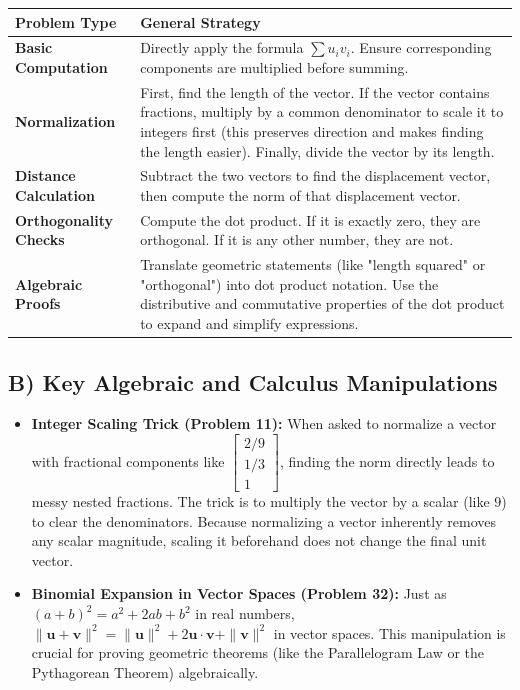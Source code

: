 \documentclass[11pt, letterpaper]{article}
\theoremstyle{definition}
\theoremstyle{remark}
\begin{document}
\renewcommand{\arraystretch}{1.5}
\begin{tabularx}{\textwidth}{>{\raggedright\arraybackslash}p{4cm} X}
\toprule
\textbf{Problem Type} & \textbf{General Strategy} \\
\midrule
\textbf{Basic Computation} & Directly apply the formula $\sum u_i v_i$. Ensure corresponding components are multiplied before summing. \\
\addlinespace[4pt]
\textbf{Normalization} & First, find the length of the vector. If the vector contains fractions, multiply by a common denominator to scale it to integers first (this preserves direction and makes finding the length easier). Finally, divide the vector by its length. \\
\addlinespace[4pt]
\textbf{Distance Calculation} & Subtract the two vectors to find the displacement vector, then compute the norm of that displacement vector. \\
\addlinespace[4pt]
\textbf{Orthogonality Checks} & Compute the dot product. If it is exactly zero, they are orthogonal. If it is any other number, they are not. \\
\addlinespace[4pt]
\textbf{Algebraic Proofs} & Translate geometric statements (like "length squared" or "orthogonal") into dot product notation. Use the distributive and commutative properties of the dot product to expand and simplify expressions. \\
\bottomrule
\end{tabularx}

\subsection{B) Key Algebraic and Calculus Manipulations}
\begin{itemize}
    \item \textbf{Integer Scaling Trick (Problem 11):} When asked to normalize a vector with fractional components like $\begin{bmatrix} 2/9 \\ 1/3 \\ 1 \end{bmatrix}$, finding the norm directly leads to messy nested fractions. The trick is to multiply the vector by a scalar (like $9$) to clear the denominators. Because normalizing a vector inherently removes any scalar magnitude, scaling it beforehand does not change the final unit vector.
    \item \textbf{Binomial Expansion in Vector Spaces (Problem 32):} Just as $(a+b)^2 = a^2 + 2ab + b^2$ in real numbers, $\|\mathbf{u}+\mathbf{v}\|^2 = \|\mathbf{u}\|^2 + 2\mathbf{u}\cdot\mathbf{v} + \|\mathbf{v}\|^2$ in vector spaces. This manipulation is crucial for proving geometric theorems (like the Parallelogram Law or the Pythagorean Theorem) algebraically.
\end{itemize}
\end{document}
